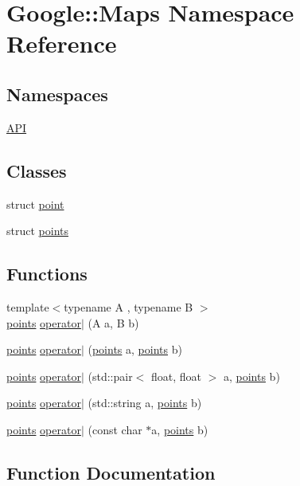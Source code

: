 \hypertarget{a00039}{}\section{Google\+:\+:Maps Namespace Reference}
\label{a00039}
\subsection*{Namespaces}
\begin{DoxyCompactItemize}
\item 
 \hyperlink{a00040}{A\+PI}
\end{DoxyCompactItemize}
\subsection*{Classes}
\begin{DoxyCompactItemize}
\item 
struct \hyperlink{a00059}{point}
\item 
struct \hyperlink{a00063}{points}
\end{DoxyCompactItemize}
\subsection*{Functions}
\begin{DoxyCompactItemize}
\item 
{\footnotesize template$<$typename A , typename B $>$ }\\\hyperlink{a00063}{points} \hyperlink{a00039_a135e48a3de2b950a7f289e911578566e}{operator$\vert$} (A a, B b)
\item 
\hyperlink{a00063}{points} \hyperlink{a00039_a8345b75d81df9d421a75fc902fe170b2}{operator$\vert$} (\hyperlink{a00063}{points} a, \hyperlink{a00063}{points} b)
\item 
\hyperlink{a00063}{points} \hyperlink{a00039_a6388de3be1005526c74c57e5121dca04}{operator$\vert$} (std\+::pair$<$ float, float $>$ a, \hyperlink{a00063}{points} b)
\item 
\hyperlink{a00063}{points} \hyperlink{a00039_ab85b8ad67a892be04acb06a1f0ea7d8f}{operator$\vert$} (std\+::string a, \hyperlink{a00063}{points} b)
\item 
\hyperlink{a00063}{points} \hyperlink{a00039_a2e6cd6535efbd0d9a92d12744e614ed8}{operator$\vert$} (const char $\ast$a, \hyperlink{a00063}{points} b)
\end{DoxyCompactItemize}


\subsection{Function Documentation}
\mbox{\label{a00039_a135e48a3de2b950a7f289e911578566e}} 
